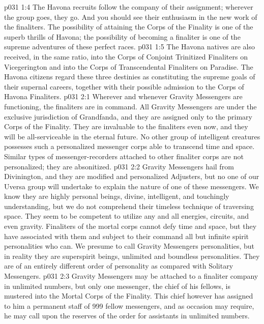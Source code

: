 \vs p031 1:4 The Havona recruits follow the company of their assignment; wherever the group goes, they go. And you should see their enthusiasm in the new work of the finaliters. The possibility of attaining the Corps of the Finality is one of the superb thrills of Havona; the possibility of becoming a finaliter is one of the supreme adventures of these perfect races.
\vs p031 1:5 The Havona natives are also received, in the same ratio, into the Corps of Conjoint Trinitized Finaliters on Vicegerington and into the Corps of Transcendental Finaliters on Paradise. The Havona citizens regard these three destinies as constituting the supreme goals of their supernal careers, together with their possible admission to the Corps of Havona Finaliters.
\vs p031 2:1 Wherever and whenever Gravity Messengers are functioning, the finaliters are in command. All Gravity Messengers are under the exclusive jurisdiction of Grandfanda, and they are assigned only to the primary Corps of the Finality. They are invaluable to the finaliters even now, and they will be all\hyp{}serviceable in the eternal future. No other group of intelligent creatures possesses such a personalized messenger corps able to transcend time and space. Similar types of messenger\hyp{}recorders attached to other finaliter corps are not personalized; they are absonitized.
\vs p031 2:2 \pc Gravity Messengers hail from Divinington, and they are modified and personalized Adjusters, but no one of our Uversa group will undertake to explain the nature of one of these messengers. We know they are highly personal beings, divine, intelligent, and touchingly understanding, but we do not comprehend their timeless technique of traversing space. They seem to be competent to utilize any and all energies, circuits, and even gravity. Finaliters of the mortal corps cannot defy time and space, but they have associated with them and subject to their command all but infinite spirit personalities who can. We presume to call Gravity Messengers personalities, but in reality they are superspirit beings, unlimited and boundless personalities. They are of an entirely different order of personality as compared with Solitary Messengers.
\vs p031 2:3 \pc Gravity Messengers may be attached to a finaliter company in unlimited numbers, but only one messenger, the chief of his fellows, is mustered into the Mortal Corps of the Finality. This chief however has assigned to him a permanent staff of 999 fellow messengers, and as occasion may require, he may call upon the reserves of the order for assistants in unlimited numbers.

